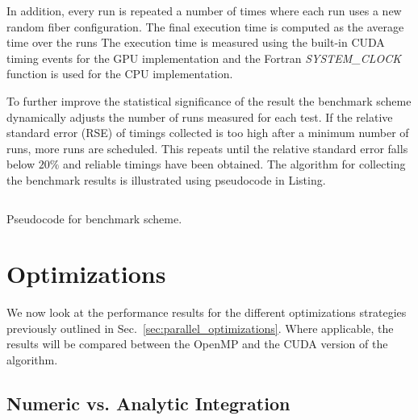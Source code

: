 In addition, every run is repeated a number of times where each run uses a new random fiber configuration. The final execution time is computed as the average time over the runs The execution time is measured using the built-in CUDA timing events for the GPU implementation and the Fortran \emph{SYSTEM\_CLOCK} function is used for the CPU implementation.

To further improve the statistical significance of the result the benchmark scheme dynamically adjusts the number of runs measured for each test. If the relative standard error (RSE) of timings collected is too high after a minimum number of runs, more runs are scheduled. This repeats until the relative standard error falls below $20\%$ and reliable timings have been obtained.  The algorithm for collecting the benchmark results is illustrated using pseudocode in Listing. 

\begin{listing}[!htbp]
  \centering
  \inputminted[mathescape,
    linenos,
    numbersep=5pt,
    fontsize=\footnotesize,
    frame=lines,
    framesep=2mm]{c}{lst/benchmark_scheme.lst}
  \caption{Pseudocode for benchmark scheme.}
  \label{lst:pseudo_benchmark}
\end{listing}

\section{Optimizations}
\label{sec:bench_optimization}

We now look at the performance results for the different optimizations strategies previously outlined in Sec.~\ref{sec:parallel_optimizations}. Where applicable, the results will be compared between the OpenMP and the CUDA version of the algorithm.

\subsection{Numeric vs. Analytic Integration}
\label{subsec:bench_numeric_vs_analytic}

